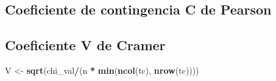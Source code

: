 \documentclass[spanish,]{book}
\newenvironment{Shaded}{\begin{snugshade}}{\end{snugshade}}
\newcommand{\KeywordTok}[1]{\textcolor[rgb]{0.13,0.29,0.53}{\textbf{#1}}}
\newcommand{\StringTok}[1]{\textcolor[rgb]{0.31,0.60,0.02}{#1}}
\newcommand{\OperatorTok}[1]{\textcolor[rgb]{0.81,0.36,0.00}{\textbf{#1}}}
\newcommand{\NormalTok}[1]{#1}
\begin{document}
\subsection{Coeficiente de contingencia C de
Pearson}\label{coeficiente-de-contingencia-c-de-pearson}

\subsection{Coeficiente V de Cramer}\label{coeficiente-v-de-cramer}

\begin{Shaded}
\begin{Highlighting}[]
\NormalTok{V <-}\StringTok{ }\KeywordTok{sqrt}\NormalTok{(chi_val}\OperatorTok{/}\NormalTok{(n }\OperatorTok{*}\StringTok{ }\KeywordTok{min}\NormalTok{(}\KeywordTok{ncol}\NormalTok{(tc), }\KeywordTok{nrow}\NormalTok{(tc))))}
\end{Highlighting}
\end{Shaded}


\end{document}
